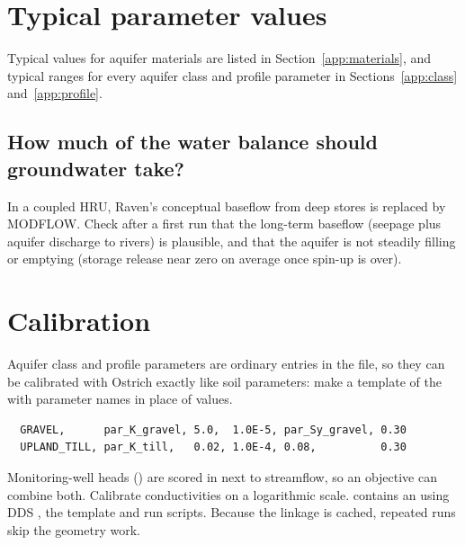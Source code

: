 \section{Typical parameter values}
Typical values for aquifer materials are listed in Section~\ref{app:materials}, and typical ranges for every aquifer class
and profile parameter in Sections~\ref{app:class} and~\ref{app:profile}.

\subsection{How much of the water balance should groundwater take?}
In a coupled HRU, Raven's conceptual baseflow from deep stores is replaced by MODFLOW. Check after a first run that the
long-term baseflow (seepage plus aquifer discharge to rivers) is plausible, and that the aquifer is not steadily filling or
emptying (storage release near zero on average once spin-up is over).

\section{Calibration}\label{ch:calib}
Aquifer class and profile parameters are ordinary entries in the  file, so they can be calibrated with Ostrich
exactly like soil parameters: make a template of the  with parameter names in place of values.
\par\noindent\begin{minipage}{\linewidth}
\begin{lstlisting}
  GRAVEL,      par_K_gravel, 5.0,  1.0E-5, par_Sy_gravel, 0.30
  UPLAND_TILL, par_K_till,   0.02, 1.0E-4, 0.08,          0.30
\end{lstlisting}
\end{minipage}\par\smallskip
Monitoring-well heads () are scored in  next to streamflow, so an
objective can combine both. Calibrate conductivities on a logarithmic scale.  contains an
 using DDS \cite{tolson2007dds}, the template and run scripts. Because the linkage is cached, repeated runs
skip the geometry work.

